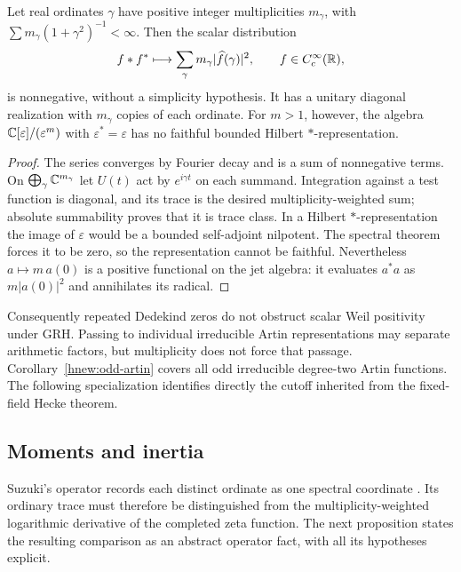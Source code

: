 \begin{proposition}
\label{prop:multiplicity-positive}
Let real ordinates $\gamma$ have positive integer multiplicities
$m_\gamma$, with $\sum m_\gamma(1+\gamma^2)^{-1}<\infty$.
Then the scalar distribution
\[
 f*f^*\longmapsto\sum_\gamma
                 m_\gamma|\widehat f(\gamma)|^2,
 \qquad f\in C_c^\infty(\mathbb R),
\]
is nonnegative, without a simplicity hypothesis. It has a unitary
diagonal realization with $m_\gamma$ copies of each ordinate.
For $m>1$, however, the algebra $\mathbb C[\varepsilon]/(\varepsilon^m)$
with $\varepsilon^*=\varepsilon$ has no faithful bounded Hilbert
$*$-representation.
\end{proposition}

\begin{proof}
The series converges by Fourier decay and is a sum of nonnegative
terms. On $\bigoplus_\gamma\mathbb C^{m_\gamma}$ let $U(t)$ act by
$e^{i\gamma t}$ on each summand. Integration against a test function
is diagonal, and its trace is the desired multiplicity-weighted sum;
absolute summability proves that it is trace class. In a Hilbert
$*$-representation the image of $\varepsilon$ would be a bounded
self-adjoint nilpotent. The spectral theorem forces it to be zero,
so the representation cannot be faithful. Nevertheless
$a\mapsto m\,a(0)$ is a positive functional on the jet algebra:
it evaluates $a^*a$ as $m|a(0)|^2$ and annihilates its radical.
\end{proof}

Consequently repeated Dedekind zeros do not obstruct scalar Weil
positivity under GRH. Passing to individual irreducible Artin
representations may separate arithmetic factors, but multiplicity
does not force that passage. Corollary~\ref{hnew:odd-artin} covers
all odd irreducible degree-two Artin functions. The following
specialization identifies directly the cutoff inherited from the
fixed-field Hecke theorem.



\subsection{Moments and inertia}
Suzuki's operator records each distinct ordinate as one spectral
coordinate \citep[Theorems~1.1--1.2]{suzuki2026}. Its ordinary trace
must therefore be distinguished from the multiplicity-weighted
logarithmic derivative of the completed zeta function. The next
proposition states the resulting comparison as an abstract operator
fact, with all its hypotheses explicit.

